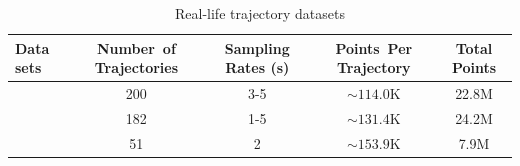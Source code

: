 \begin{table}[tb!]
	\caption{\small Real-life trajectory datasets}
	\centering
	\footnotesize
	\begin{tabular}{|l|c|c|c|c|}
		\hline
		\bf{Data sets}& \bf{Number\ of Trajectories}     &\bf{Sampling Rates (s)}   &\bf{Points~Per Trajectory}    &\bf{Total Points} \\	\hline
		\ucar	&200	    &3-5	&$\sim114.0$K   &22.8M 	\\	\hline
		\geolife \cite{Web:Geolife}&182	    &1-5	&$\sim131.4$K   &24.2M	\\	\hline
		\mopsi \cite{Web:Mopsi}  &51	    	&2	    &$\sim153.9$K   &7.9M	\\	\hline
	\end{tabular}
	\label{tab:datasets}
	\vspace{-2ex}
\end{table}





